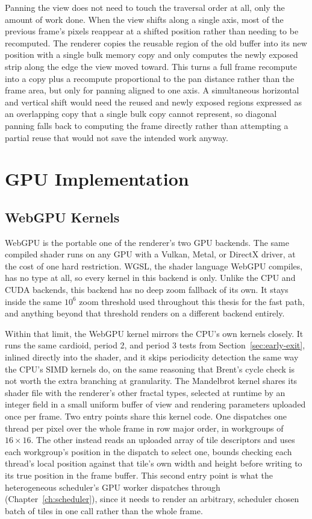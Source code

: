 \documentclass{ftndiplomski}
\begin{document}
Panning the view does not need to touch the traversal order at all, only the amount of work done.
When the view shifts along a single axis, most of the previous frame's pixels reappear at a shifted
position rather than needing to be recomputed. The renderer copies the reusable region of the old
buffer into its new position with a single bulk memory copy and only computes the newly exposed
strip along the edge the view moved toward. This turns a full frame recompute into a copy plus a
recompute proportional to the pan distance rather than the frame area, but only for panning aligned
to one axis. A simultaneous horizontal and vertical shift would need the reused and newly exposed
regions expressed as an overlapping copy that a single bulk copy cannot represent, so diagonal
panning falls back to computing the frame directly rather than attempting a partial reuse that
would not save the intended work anyway.

\chapter{GPU Implementation}
\label{ch:gpu}

\section{WebGPU Kernels}
\label{sec:webgpu}

WebGPU is the portable one of the renderer's two GPU backends. The same compiled shader runs on any GPU
with a Vulkan, Metal, or DirectX driver, at the cost of one hard restriction. WGSL, the shader
language WebGPU compiles, has no  type at all, so every kernel in this backend is
 only. Unlike the CPU and CUDA backends, this backend has no deep zoom fallback of its
own. It stays inside the same $10^6$ zoom threshold used throughout this thesis for the 
fast path, and anything beyond that threshold renders on a different backend entirely.

Within that limit, the WebGPU kernel mirrors the CPU's own  kernels closely. It runs the
same cardioid, period 2, and period 3 tests from Section~\ref{sec:early-exit}, inlined directly into the
shader, and it skips periodicity detection the same way the CPU's SIMD kernels do, on the same
reasoning that Brent's cycle check is not worth the extra branching at  granularity.
The Mandelbrot kernel shares its shader file with the renderer's other fractal types, selected at
runtime by an integer field in a small uniform buffer of view and rendering parameters uploaded
once per frame. Two entry
points share this kernel code. One dispatches one thread per pixel over the whole frame in
row major order, in workgroups of $16 \times 16$. The other instead reads an uploaded array of tile
descriptors and uses each workgroup's position in the dispatch to select one, bounds checking each
thread's local position against that tile's own width and height before writing to its true
position in the frame buffer. This second entry point is what the heterogeneous scheduler's GPU
worker dispatches through (Chapter~\ref{ch:scheduler}), since it needs to render an
arbitrary, scheduler chosen batch of tiles in one call rather than the whole frame.
\end{document}
